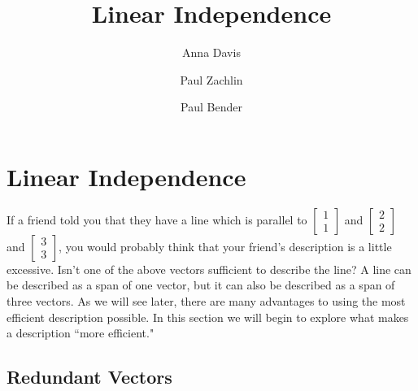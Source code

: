 \documentclass{ximera}
\author{Anna Davis \and Paul Zachlin \and Paul Bender} \title{Linear Independence} \license{CC-BY 4.0}
\begin{document}
\begin{abstract}
 \end{abstract}
\maketitle

\section*{Linear Independence}
If a friend told you that they have a line which is parallel to $\begin{bmatrix}1\\1\end{bmatrix}$ and $\begin{bmatrix}2\\2\end{bmatrix}$ and $\begin{bmatrix}3\\3\end{bmatrix}$, you would probably think that your friend's description is a little excessive.  Isn't one of the above vectors sufficient to describe the line?  A line can be described as a span of one vector, but it can also be described as a span of three vectors.  As we will see later, there are many advantages to using the most efficient description possible.  In this section we will begin to explore what makes a description ``more efficient."
\subsection*{Redundant Vectors}
\end{document}
